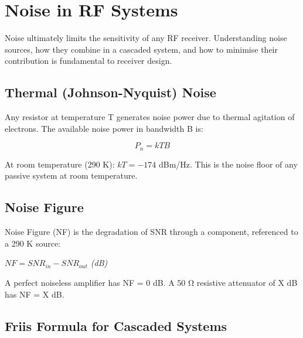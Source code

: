 \section{Noise in RF Systems}\label{sec:wiki_noise}



Noise ultimately limits the sensitivity of any RF receiver. Understanding noise sources, how they combine in a cascaded system, and how to minimise their contribution is fundamental to receiver design.

				

\subsection{Thermal (Johnson-Nyquist) Noise}

				

Any resistor at temperature T generates noise power due to thermal agitation of electrons. The available noise power in bandwidth B is:

				
\[P_n = kTB\]

				

At room temperature (290 K): $kT = -174$ dBm/Hz. This is the noise floor of any passive system at room temperature.

				

\subsection{Noise Figure}

				

Noise Figure (NF) is the degradation of SNR through a component, referenced to a 290 K source:


				

\noindent\hspace*{1.2em}\textit{$NF = SNR_{in} - SNR_{out}$ (dB)}

				

A perfect noiseless amplifier has NF = 0 dB. A 50 Ω resistive attenuator of X dB has NF = X dB.

				

\subsection{Friis Formula for Cascaded Systems}

